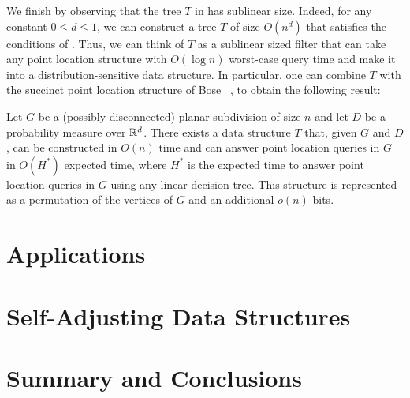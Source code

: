 \documentclass{patmorin}
\begin{document}
We finish by observing that the tree $T$ in 
has sublinear size. Indeed, for any constant $0 \le d \le 1$, we can
construct a tree $T$ of size $O(n^d)$ that satisfies the conditions
of .  Thus, we can think of $T$ as a sublinear
sized filter that can take any point location structure with $O(\log n)$
worst-case query time and make it into a distribution-sensitive data
structure.  In particular, one can combine $T$ with the succinct point
location structure of Bose \etal\ \cite[Theorem~2]{bchmm09}, to obtain the
following result:

\begin{thm}
  Let $G$ be a (possibly disconnected) planar subdivision of size $n$
  and let $D$ be a probability measure over $\mathbb{R}^d$.  There exists a data
  structure $T$ that, given $G$ and $D$, can be constructed in $O(n)$
  time and can answer point location queries in $G$ in $O(H^*)$ expected
  time, where $H^*$ is the expected time to answer point location queries
  in $G$ using any linear decision tree.  This structure is represented
  as a permutation of the vertices of $G$ and an additional $o(n)$ bits.
\end{thm}

\section{Applications}

\section{Self-Adjusting Data Structures}

\section{Summary and Conclusions}





\end{document}
